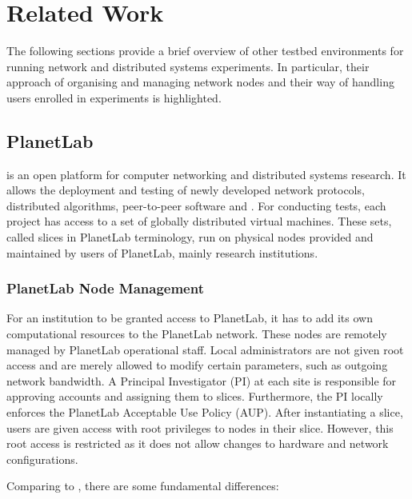 \chapter{Related Work}

The following sections provide a brief overview of other testbed environments for running network and distributed systems experiments. In particular, their approach of organising and managing network nodes and their way of handling users enrolled in experiments is highlighted.

\section{PlanetLab}

 is an open platform for computer networking and distributed systems research. It allows the deployment and testing of newly developed network protocols, distributed algorithms, peer-to-peer software and . \cite{MA} For conducting tests, each project has access to a set of globally distributed virtual machines. These sets, called slices in PlanetLab terminology, run on physical nodes provided and maintained by users of PlanetLab, mainly research institutions.

\subsection{PlanetLab Node Management}

For an institution to be granted access to PlanetLab, it has to add its own computational resources to the PlanetLab network. \cite{planetlab_two_nodes} These nodes are remotely managed by PlanetLab operational staff. Local administrators are not given root access and are merely allowed to modify certain parameters, such as outgoing network bandwidth. \cite{planetlab_hosting_req} A Principal Investigator (PI) at each site is responsible for approving accounts and assigning them to slices. Furthermore, the PI locally enforces the PlanetLab Acceptable Use Policy (AUP). After instantiating a slice, users are given  access with root privileges to nodes in their slice. However, this root access is restricted as it does not allow changes to hardware and network configurations. \cite{planetlab_user_guide} 

Comparing to \lee, there are some fundamental differences:

